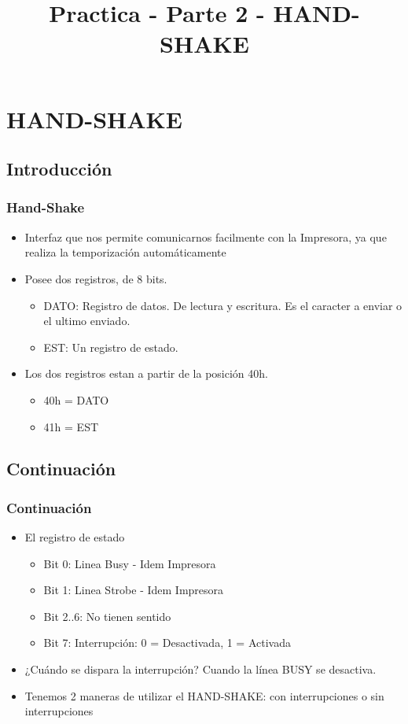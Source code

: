 \documentclass{beamer}
\title{Practica  - Parte 2 - HAND-SHAKE}
\begin{document}
\begin{frame}
\titlepage
\end{frame}

\section{HAND-SHAKE}
\subsection{Introducción}
\begin{frame}
\frametitle{Hand-Shake}
\begin{itemize}
 \item Interfaz que nos permite comunicarnos facilmente con la Impresora, ya que realiza la temporización automáticamente
 \item Posee dos registros, de 8 bits.
  \begin{itemize}
   \item DATO: Registro de datos. De lectura y escritura. Es el caracter a enviar o el ultimo enviado.
   \item EST: Un registro de estado.
  \end{itemize}
 \item Los dos registros estan a partir de la posición 40h. 
  \begin{itemize}
      \item 40h = DATO
      \item 41h = EST
\end{itemize}
\end{itemize}
\end{frame}

\subsection{Continuación}
\begin{frame}
\frametitle{Continuación}
\begin{itemize}
 \item El registro de estado 
 \begin{itemize}
   \item Bit 0: Linea Busy - Idem Impresora
   \item Bit 1: Linea Strobe - Idem Impresora
   \item Bit 2..6: No tienen sentido
   \item Bit 7: Interrupción: 0 = Desactivada, 1 = Activada
  \end{itemize}
 \item ¿Cuándo se dispara la interrupción? Cuando la línea BUSY se desactiva.
 \item Tenemos 2 maneras de utilizar el HAND-SHAKE: con interrupciones o sin interrupciones
\end{itemize}
\end{frame}
\end{document}

